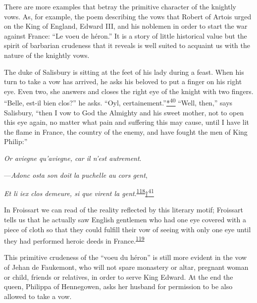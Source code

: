 There are more examples that betray the primitive character of the
knightly vows. As, for example, the poem describing the vows that Robert
of Artois urged on the King of England, Edward III, and his noblemen in
order to start the war against France: ``Le voeu de héron.'' It is a
story of little historical value but the spirit of
\protect\hypertarget{10_Chapter_Three__THE_HEROIC_DREAM.xhtmlux5cux23page_99}{}{}barbarian
crudeness that it reveals is well suited to acquaint us with the nature
of the knightly vows.

The duke of Salisbury is sitting at the feet of his lady during a feast.
When his turn to take a vow has arrived, he asks his beloved to put a
finger on his right eye. Even two, she answers and closes the right eye
of the knight with two fingers. ``Belle, est-il bien clos?'' he asks.
``Oyl,
certainement.''\protect\hypertarget{10_Chapter_Three__THE_HEROIC_DREAM.xhtmlux5cux23id_2541}{\protect\hyperlink{23_NOTES.xhtmlux5cux23id_2542}{*\textsuperscript{40}}}
``Well, then,'' says Salisbury, ``then I vow to God the Almighty and his
sweet mother, not to open this eye again, no matter what pain and
suffering this may cause, until I have lit the flame in France, the
country of the enemy, and have fought the men of King Philip:''

\emph{Or aviegne qu'aviegne, car il n'est autrement}.

---\emph{Adonc osta son doit la puchelle au cors gent},

\emph{Et li iex clos demeure, si que virent la
gent}.\textsuperscript{\protect\hypertarget{10_Chapter_Three__THE_HEROIC_DREAM.xhtmlux5cux23id_1699}{\protect\hyperlink{23_NOTES.xhtmlux5cux23id_1700}{118}}}\protect\hypertarget{10_Chapter_Three__THE_HEROIC_DREAM.xhtmlux5cux23id_2543}{\protect\hyperlink{23_NOTES.xhtmlux5cux23id_2544}{†\textsuperscript{41}}}

In Froissart we can read of the reality reflected by this literary
motif; Froissart tells us that he actually saw English gentlemen who had
one eye covered with a piece of cloth so that they could fulfill their
vow of seeing with only one eye until they had performed heroic deeds in
France.\textsuperscript{\protect\hypertarget{10_Chapter_Three__THE_HEROIC_DREAM.xhtmlux5cux23id_1697}{\protect\hyperlink{23_NOTES.xhtmlux5cux23id_1698}{119}}}

This primitive crudeness of the ``voeu du héron'' is still more evident
in the vow of Jehan de Faukemont, who will not spare monastery or altar,
pregnant woman or child, friends or relatives, in order to serve King
Edward. At the end the queen, Philippa of Hennegowen, asks her husband
for permission to be also allowed to take a vow.

